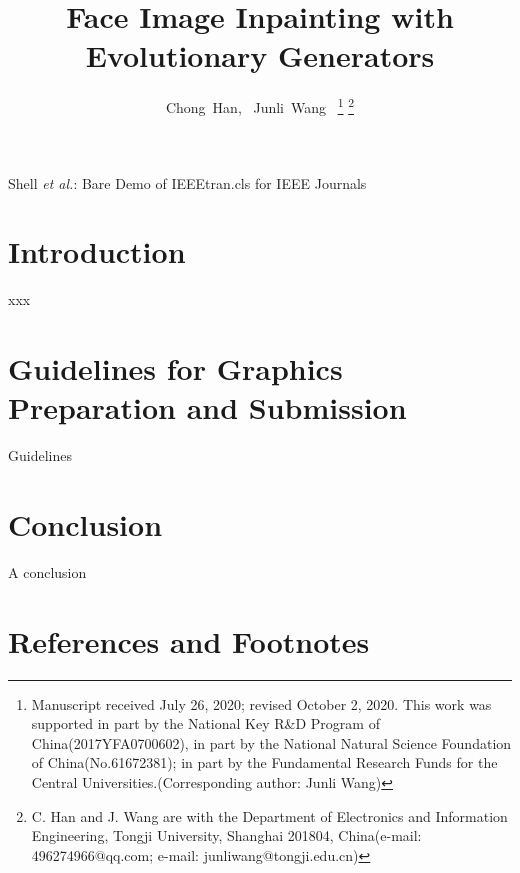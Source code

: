 \documentclass[journal]{IEEEtran}
\begin{document}
\title{Face Image Inpainting with Evolutionary Generators}

\author{Chong~Han,~\IEEEmembership{}
        Junli~Wang~\IEEEmembership{}
\thanks{Manuscript received July 26, 2020; revised October 2, 2020. This work was supported in part by the National Key R\&D Program of China(2017YFA0700602), in part by the National Natural Science Foundation of China(No.61672381); in part by the Fundamental Research Funds for the Central Universities.(Corresponding author: Junli Wang)}
\thanks{C. Han and J. Wang are with the Department of Electronics and Information Engineering, Tongji University, Shanghai 201804, China(e-mail: 496274966@qq.com; e-mail: junliwang@tongji.edu.cn)}
}

{Shell \MakeLowercase{\textit{et al.}}: Bare Demo of IEEEtran.cls for IEEE Journals}

\begin{abstract}

\end{abstract}

\begin{IEEEkeywords}

\end{IEEEkeywords}


\IEEEpeerreviewmaketitle



\section{Introduction}

 xxx

\section{Guidelines for Graphics Preparation and Submission}
Guidelines

\section{Conclusion}
A conclusion 


\section*{References and Footnotes}
\end{document}
